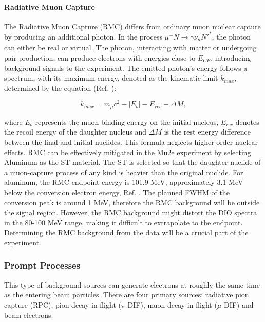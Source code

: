 \paragraph{Radiative Muon Capture}

The Radiative Muon Capture (RMC) differs from ordinary muon nuclear capture by producing an additional photon. In the process $\mu^- N \rightarrow\gamma \nu_\mu N'^* $, the photon can either be real or virtual. The photon, interacting with matter or undergoing pair production, can produce electrons with energies close to $E_{CE}$, introducing background signals to the experiment. The emitted photon's energy follows a spectrum, with its maximum energy, denoted as the kinematic limit $k_{max}$, determined by the equation (Ref. \cite{bartoszek2015mu2e}):

\begin{equation}
k_{max} = m_\mu c^2 - |E_b| - E_{rec} - \Delta M ,
\end{equation}

where $E_b$ represents the muon binding energy on the initial nucleus, $E_{rec}$ denotes 
the recoil energy of the daughter nucleus and $\Delta M$ is the rest energy difference 
between the final and initial nuclides. This formula neglects higher order nuclear effects. 
RMC can be effectively mitigated in the Mu2e experiment by selecting Aluminum as the ST material. The ST is selected so that the daughter nuclide of a muon-capture 
process of any kind is heavier than the original nuclide. For aluminum, the RMC endpoint energy 
is 101.9 MeV, approximately 3.1 MeV below the conversion electron energy, Ref. \cite{bartoszek2015mu2e}. 
The planned FWHM of the conversion peak is around 1 MeV, therefore the RMC background will be 
outside the signal region. However, the RMC background might distort the DIO spectra in the 80-100 MeV 
range, making it difficult to extrapolate to the endpoint. Determining the RMC background from the 
data will be a crucial part of the experiment.
\subsubsection{Prompt Processes}
This type of background sources can generate electrons at roughly the same time as 
the entering beam particles. There are four primary sources: radiative pion capture (RPC), 
pion decay-in-flight ($\pi$-DIF), muon decay-in-flight ($\mu$-DIF) and beam electrons.
